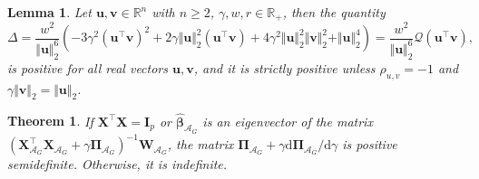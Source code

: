 \documentclass[10pt,a4paper]{amsart}
\newtheorem{theorem}{Theorem}
\newtheorem{lemma}{Lemma}
\newcommand{\Aset}{\mathcal{A}}
\newcommand{\T}{\top}
\def\bI{\mathbf{I}}
\def\bPi{\boldsymbol{\Pi}}
\def\bW{\mathbf{W}}
\def\bX{\mathbf{X}}
\newcommand{\betahat}{\widehat{\boldsymbol\beta}}
\begin{document}
\begin{lemma}
\label{lemma:Delta_sign}
Let $\boldsymbol{u},\boldsymbol{v} \in \mathbb{R}^n$ with $n\geq 2$, $\gamma, w, r \in \mathbb{R}_+$, then the quantity 
$$
\Delta=\frac{w^2}{\Vert \boldsymbol{u} \Vert_2^6} \left(
-3\gamma^2(\boldsymbol{u}^{\T} \boldsymbol{v})^2 
+ 2\gamma \Vert \boldsymbol{u} \Vert_2^2 (\boldsymbol{u}^{\T} \boldsymbol{v}) 
+ 4\gamma^2 \Vert \boldsymbol{u} \Vert_2^2 \Vert \boldsymbol{v} \Vert_2^2 
+ \Vert \boldsymbol{u} \Vert_2^4 \right)=\frac{w^2}{\Vert \boldsymbol{u} \Vert_2^6}\mathcal{Q}(\boldsymbol{u}^{\T}\boldsymbol{v}),
$$ 
is positive for all real vectors $\boldsymbol{u}, \boldsymbol{v}$, and it is strictly positive unless $\rho_{u,v} = -1$ and $\gamma \Vert \boldsymbol{v} \Vert_2 = \Vert \boldsymbol{u} \Vert_2$. 
\end{lemma}

\begin{theorem}
\label{th:matrix_Pi_indefinite}
    If $\bX^{\T} \bX = \bI_p$ or $\betahat_{\Aset_G}$ is an eigenvector of the matrix $(\bX_{\Aset_G}^{\T} \bX_{\Aset_G} + \gamma \bPi_{\Aset_G})^{-1} \bW_{\Aset_G}$, the matrix $\bPi_{\Aset_G} + \gamma \mathrm{d} \bPi_{\Aset_G} / \mathrm{d}\gamma$ is positive semidefinite. Otherwise, it is indefinite.
\end{theorem}
\end{document}
